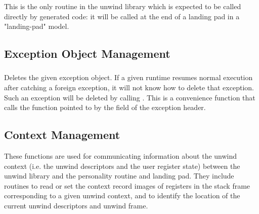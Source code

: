 This is the only routine in the unwind library which is expected
to be called directly by generated code: it will be called at the
end of a landing pad in a "landing-pad" model.

\subsection{Exception Object Management}

\subsubsection{}


\begin{sloppypar}
Deletes the given exception object. If a given runtime resumes normal
execution after catching a foreign exception, it will not know how to
delete that exception. Such an exception will be deleted by calling
. This is a convenience function that calls
the function pointed to by the  field of the exception
header.
\end{sloppypar}

\subsection{Context Management}

These functions are used for communicating information about the unwind
context (i.e. the unwind descriptors and the user register state) between
the unwind library and the personality routine and landing pad. They
include routines to read or set the context record images of registers in
the stack frame corresponding to a given unwind context, and to identify
the location of the current unwind descriptors and unwind frame.

\subsubsection{}


